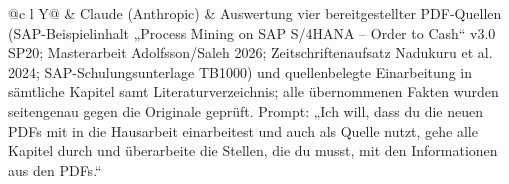 \begin{table}[htbp]
\begin{tabularx}{\textwidth}{@{}c l Y@{}}
 & Claude (Anthropic) & Auswertung vier bereitgestellter PDF-Quellen (SAP-Beispielinhalt „Process Mining on SAP S/4HANA -- Order to Cash“ v3.0 SP20; Masterarbeit Adolfsson/Saleh 2026; Zeitschriftenaufsatz Nadukuru et al. 2024; SAP-Schulungsunterlage TB1000) und quellenbelegte Einarbeitung in sämtliche Kapitel samt Literaturverzeichnis; alle übernommenen Fakten wurden seitengenau gegen die Originale geprüft. Prompt: „Ich will, dass du die neuen PDFs mit in die Hausarbeit einarbeitest und auch als Quelle nutzt, gehe alle Kapitel durch und überarbeite die Stellen, die du musst, mit den Informationen aus den PDFs.“ \\
\bottomrule
\end{tabularx}
\end{table}


